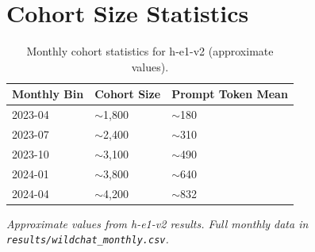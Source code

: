 \section{Cohort Size Statistics}
\label{app:cohort_stats}

\begin{table}[h]
\centering
\caption{Monthly cohort statistics for h-e1-v2 (approximate values).}
\label{tab:cohort}
\begin{tabular}{lll}
\toprule
Monthly Bin & Cohort Size & Prompt Token Mean \\
\midrule
2023-04 & $\sim$1,800 & $\sim$180 \\
2023-07 & $\sim$2,400 & $\sim$310 \\
2023-10 & $\sim$3,100 & $\sim$490 \\
2024-01 & $\sim$3,800 & $\sim$640 \\
2024-04 & $\sim$4,200 & $\sim$832 \\
\bottomrule
\end{tabular}
\end{table}

\textit{Approximate values from h-e1-v2 results. Full monthly data in \texttt{results/wildchat\_monthly.csv}.}
